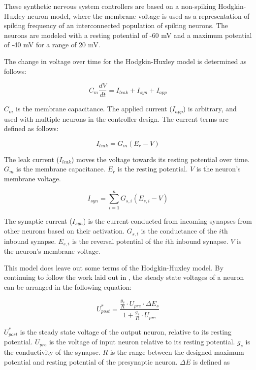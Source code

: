 These synthetic nervous system controllers are based on a non-spiking Hodgkin-Huxley neuron model, where the membrane voltage is used as a representation of spiking frequency of an interconnected population of spiking neurons. The neurons are modeled with a resting potential of -60 mV and a maximum potential of -40 mV for a range of 20 mV.

The change in voltage over time for the Hodgkin-Huxley model is determined as follows:

\begin{equation}
C_{m} \dfrac{d V}{d t} = I_{leak} + I_{syn} + I_{app}
\end{equation}

$C_{m}$ is the membrane capacitance.
The applied current ($I_{app}$) is arbitrary, and used with multiple neurons in the controller design.
The current terms are defined as follows:

\begin{equation}
I_{leak} = G_{m} (E_{r} - V)
\end{equation}

The leak current ($I_{leak}$) moves the voltage towards its resting potential over time. $G_{m}$ is the membrane capacitance. $E_{r}$ is the resting potential. $V$ is the neuron's membrane voltage.

\begin{equation}
I_{syn} = \sum_{i=1}^{n} G_{s, i} (E_{s, i} - V)
\end{equation}

The synaptic current ($I_{syn}$) is the current conducted from incoming synapses from other neurons based on their activation.
$G_{s, i}$ is the conductance of the $i$th inbound synapse. $E_{s, i}$ is the reversal potential of the $i$th inbound synapse.
$V$ is the neuron's membrane voltage.

This model does leave out some terms of the Hodgkin-Huxley model. By continuing to follow the work laid out in \cite{NickFunctionalSubnetwork}, the steady state voltages of a neuron can be arranged in the following equation:

\begin{equation}
U_{post}^{*} = \dfrac{\frac{g_{s}}{R} \cdot U_{pre} \cdot \Delta E_{s}}{1 + \frac{g_{s}}{R} \cdot U_{pre}}
\end{equation}

$U_{post}^{*}$ is the steady state voltage of the output neuron, relative to its resting potential. $U_{pre}$ is the voltage of input neuron relative to its resting potential. $g_{s}$ is the conductivity of the synapse.
$R$ is the range between the designed maximum potential and resting potential of the presynaptic neuron. $\Delta E$ is defined as 

